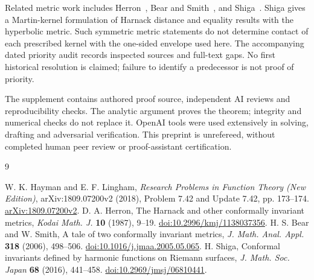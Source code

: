 \documentclass[11pt]{article}
\begin{document}
Related metric work includes Herron~\cite{Herron}, Bear and Smith~\cite{BS}, and Shiga~\cite{Shiga}. Shiga gives a Martin-kernel formulation of Harnack distance and equality results with the hyperbolic metric. Such symmetric metric statements do not determine contact of each prescribed kernel with the one-sided envelope used here. The accompanying dated priority audit records inspected sources and full-text gaps. No first historical resolution is claimed; failure to identify a predecessor is not proof of priority.

The supplement contains authored proof source, independent AI reviews and reproducibility checks. The analytic argument proves the theorem; integrity and numerical checks do not replace it. OpenAI tools were used extensively in solving, drafting and adversarial verification. This preprint is unrefereed, without completed human peer review or proof-assistant certification.

\begin{thebibliography}{9}
\small\raggedright
{} W. K. Hayman and E. F. Lingham,
\emph{Research Problems in Function Theory (New Edition)},
arXiv:1809.07200v2 (2018), Problem 7.42 and Update 7.42, pp. 173--174.
\href{https://arxiv.org/abs/1809.07200v2}{arXiv:1809.07200v2}.
 D. A. Herron,
The Harnack and other conformally invariant metrics,
\emph{Kodai Math. J.} \textbf{10} (1987), 9--19.
\href{https://doi.org/10.2996/kmj/1138037356}{doi:10.2996/kmj/1138037356}.
 H. S. Bear and W. Smith,
A tale of two conformally invariant metrics,
\emph{J. Math. Anal. Appl.} \textbf{318} (2006), 498--506.
\href{https://doi.org/10.1016/j.jmaa.2005.05.065}{doi:10.1016/j.jmaa.2005.05.065}.
 H. Shiga,
Conformal invariants defined by harmonic functions on Riemann surfaces,
\emph{J. Math. Soc. Japan} \textbf{68} (2016), 441--458.
\href{https://doi.org/10.2969/jmsj/06810441}{doi:10.2969/jmsj/06810441}.
\end{thebibliography}
\end{document}
